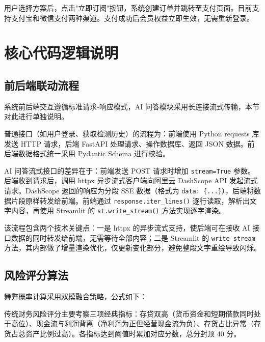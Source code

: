 \documentclass[12pt,a4paper]{ctexart}
\begin{document}
用户选择方案后，点击"立即订阅"按钮，系统创建订单并跳转至支付页面。目前支持支付宝和微信支付两种渠道。支付成功后会员权益立即生效，无需重新登录。

\newpage

\section{核心代码逻辑说明}

\subsection{前后端联动流程}

系统前后端交互遵循标准请求-响应模式，AI 问答模块采用长连接流式传输，本节对此进行单独说明。

普通接口（如用户登录、获取检测历史）的流程为：前端使用 Python requests 库发送 HTTP 请求，后端 FastAPI 处理请求、操作数据库、返回 JSON 数据。前后端数据格式统一采用 Pydantic Schema 进行校验。

AI 问答流式接口的差异在于：前端发送 POST 请求时增加 \texttt{stream=True} 参数。后端收到请求后，调用 httpx 异步流式客户端向阿里云 DashScope API 发起流式请求。DashScope 返回的响应为分段 SSE 数据（格式为 \texttt{data: \{...\}}），后端将数据片段原样转发给前端。前端通过 \texttt{response.iter\_lines()} 逐行读取，解析出文字内容，再使用 Streamlit 的 \texttt{st.write\_stream()} 方法实现逐字渲染。

该流程包含两个技术关键点：一是 httpx 的异步流式支持，使后端可在接收 AI 接口数据的同时转发给前端，无需等待全部内容；二是 Streamlit 的 \texttt{write\_stream} 方法，其内部做了增量渲染优化，仅更新变化部分，避免整段文字重绘导致闪烁。

\subsection{风险评分算法}

舞弊概率计算采用双模融合策略，公式如下：

\begin{center}
\end{center}

传统财务风险评分主要考察三项经典指标：存贷双高（货币资金和短期借款同时处于高位）、现金流与利润背离（净利润为正但经营现金流为负）、存货占比异常（存货占总资产比例过高）。各指标达到阈值时累加对应分数，总分封顶 40 分。
\end{document}
